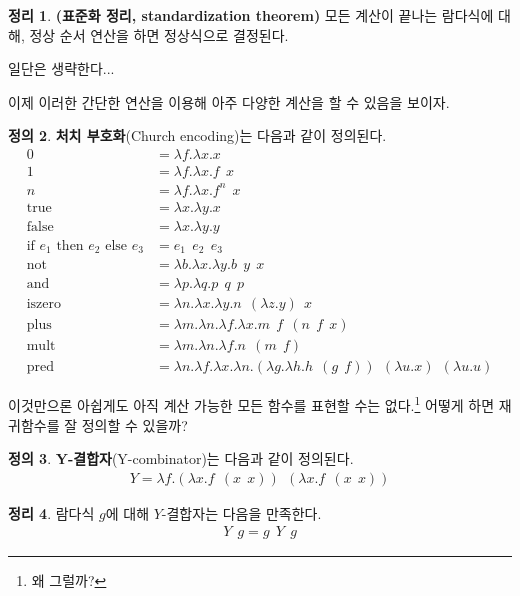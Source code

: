 \documentclass[b5paper, 11pt]{book}
\theoremstyle{definition}
\newtheorem{defn}{정의}[chapter]
\newtheorem{thm}[defn]{정리}
\newenvironment{pf*}{\pushQED{\qed}\pf}
{\popQED\endpf}
\begin{document}
\begin{thm}
    \textbf{(표준화 정리, standardization theorem)} 모든 계산이 끝나는 람다식에 대해, 정상 순서 연산을 하면 정상식으로 결정된다.
\end{thm}
\begin{pf*}
    일단은 생략한다...
\end{pf*}
이제 이러한 간단한 연산을 이용해 아주 다양한 계산을 할 수 있음을 보이자.
\begin{defn}
    \textbf{처치 부호화}(Church encoding)는 다음과 같이 정의된다.
    \begin{align*}
        0 &= \lambda f. \lambda x. x \\ 
        1 &= \lambda f. \lambda x. f \;\, x  \\ 
        n &= \lambda f. \lambda x. f^n \;\, x \\
        \text{true} &= \lambda x. \lambda y. x \\ 
        \text{false} &= \lambda x. \lambda y. y \\ 
        \text{if } e_1 \text{ then } e_2 \text { else } e_3 &=
        e_1 \;\, e_2 \;\, e_3 \\ 
        \text{not} &= \lambda b. \lambda x. \lambda y. b \;\, y \;\, x \\ 
        \text{and} &= \lambda p. \lambda q. p \;\, q \;\, p\\
        \text{iszero} &= \lambda n. \lambda x. \lambda y. n \;\, (\lambda z. y) \;\, x \\
        \text{plus} &= \lambda m. \lambda n. \lambda f. \lambda x. m \;\, f \;\, (n\;\, f\;\, x) \\
        \text{mult} &= \lambda m. \lambda n. \lambda f. n \;\, (m \;\, f)  \\ 
        \text{pred} &= \lambda n. \lambda f. \lambda x. \lambda n. (\lambda g. \lambda h.
        h \;\, (g \;\, f)) \;\, (\lambda u. x) \;\, (\lambda u. u)
    \end{align*}
\end{defn}
이것만으론 아쉽게도 아직 계산 가능한 모든 함수를 표현할 수는 없다.\footnote{왜 그럴까?} 어떻게 하면 재귀함수를 잘 정의할 수 있을까? 
\begin{defn}
    \textbf{Y-결합자}(Y-combinator)는 다음과 같이 정의된다.
    \begin{align*}
        Y = \lambda f.(\lambda x. f \;\, (x\;\, x)) \;\, (\lambda x. f \;\, (x \;\, x))
    \end{align*}
\end{defn}
\begin{thm}
    람다식 $g$에 대해 $Y$-결합자는 다음을 만족한다.
    \begin{align*}
        Y \;\, g = g \;\, Y \;\, g
    \end{align*}
\end{thm}
\end{document}
